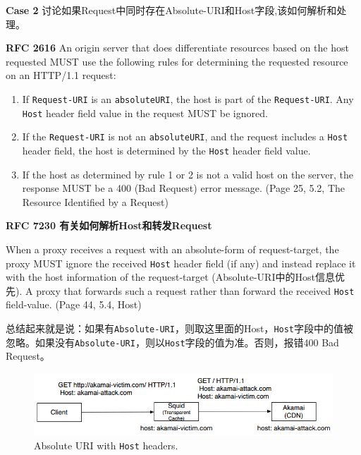 \vspace{2ex}
\textbf{Case 2} 讨论如果Request中同时存在Absolute-URI和Host字段,该如何解析和处理。
\begin{spacing}{0.8}
	\begin{tcolorbox}
		\textbf{RFC 2616}
		An origin server that does differentiate resources based on the host requested MUST use the following rules for determining the requested resource on an HTTP/1.1 request:
		\begin{enumerate}
			\item If \texttt{Request-URI} is an \texttt{absoluteURI}, the host is part of the \texttt{Request-URI}. Any \texttt{Host} header field value in the request MUST be ignored.
			\item If the \texttt{Request-URI} is not an \texttt{absoluteURI}, and the request includes a \texttt{Host} header field, the host is determined by the \texttt{Host} header field value.
			\item If the host as determined by rule 1 or 2 is not a valid host on the server, the response MUST be a 400 (Bad Request) error message. (Page 25, 5.2, The Resource Identified by a Request)
		\end{enumerate}
	\end{tcolorbox}
\end{spacing}
\vspace{1ex}
\begin{spacing}{0.8}
	\begin{tcolorbox}
		\textbf{RFC 7230 有关如何解析Host和转发Request}
		
		When a proxy receives a request with an absolute-form of request-target, the proxy MUST ignore the received \texttt{Host} header field (if any) and instead replace it with the host information of the
		request-target (Absolute-URI中的Host信息优先). A proxy that forwards such a request {\color{red}{MUST generate a new Host field-value based on the received request-target}} rather than forward the received \texttt{Host} field-value. (Page 44, 5.4, Host)
	\end{tcolorbox}
\end{spacing}

总结起来就是说：如果有\texttt{Absolute-URI}，则取这里面的Host，\texttt{Host}字段中的值被忽略。如果没有\texttt{Absolute-URI}，则以\texttt{Host}字段的值为准。否则，报错400 Bad Request。

\begin{figure}[tbph!]
	\centering
	\includegraphics[width=1.0\linewidth]{images/AbsoluteURI_Host}
	\caption{Absolute URI with \texttt{Host} headers.}
	\label{fig:absolute-uri_host}
\end{figure}

